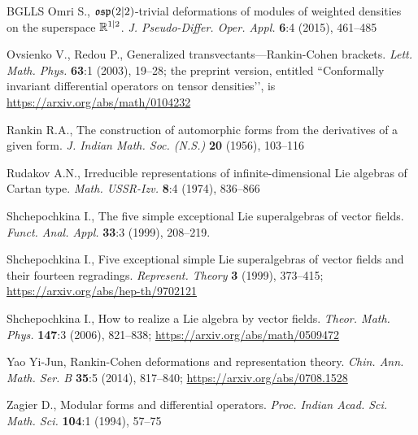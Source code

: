 \documentclass[12pt,a4paper]{amsart}
\theoremstyle{thm}
\theoremstyle{definition}
\begin{document}
\begin{thebibliography}{BGLLS}
Omri S., ${\mathfrak{osp}}(2|2)$-trivial deformations of modules of weighted
densities on the superspace ${\mathbb R}^{1|2}$. \textit{J. Pseudo-Differ. Oper. Appl.}
\textbf{6}:4 (2015), 461--485

Ovsienko V., Redou P., Generalized transvectants---Rankin-Cohen brackets.
\textit{Lett. Math. Phys.} \textbf{63}:1 (2003), 19--28; the preprint version, entitled
``Conformally invariant differential operators on tensor densities\rq\rq, is
\url{https://arxiv.org/abs/math/0104232}

Rankin R.A., The construction of automorphic forms from the derivatives of a given form.
\textit{J. Indian Math. Soc. \textup{(}N.S.\textup{)}} \textbf{20} (1956), 103--116

Rudakov A.N., Irreducible representations of infinite-dimensional Lie algebras of Cartan type.
\textit{Math. USSR-Izv.} \textbf{8}:4 (1974), 836--866

Shchepochkina I., The five simple exceptional Lie superalgebras of vector fields.
\textit{Funct. Anal. Appl.} \textbf{33}:3 (1999), 208--219.

Shchepochkina I., Five exceptional simple Lie superalgebras of vector fields and their
fourteen regradings. \textit{Represent. Theory} \textbf{3} (1999), 373--415;
\url{https://arxiv.org/abs/hep-th/9702121}

Shchepochkina I., How to realize a Lie algebra by vector fields.
\textit{Theor. Math. Phys.} \textbf{147}:3 (2006), 821--838;
\url{https://arxiv.org/abs/math/0509472}

Yao Yi-Jun, Rankin-Cohen deformations and representation theory.
\textit{Chin. Ann. Math. Ser. B} \textbf{35}:5 (2014), 817--840;
\url{https://arxiv.org/abs/0708.1528}

Zagier D., Modular forms and differential operators. \textit{Proc. Indian Acad. Sci. Math.
Sci.} \textbf{104}:1 (1994), 57--75

\end{thebibliography}
\end{document}
